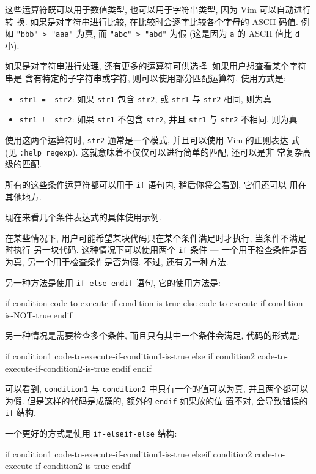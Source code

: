 这些运算符既可以用于数值类型, 也可以用于字符串类型, 因为 Vim 可以自动进行转
换. 如果是对字符串进行比较, 在比较时会逐字比较各个字母的 ASCII 码值. 例如
\texttt{"bbb" > "aaa"} 为真, 而 \texttt{"abc" > "abd"} 为假 (这是因为
\texttt{a} 的 ASCII 值比 \texttt{d} 小).

如果是对字符串进行处理, 还有更多的运算符可供选择. 如果用户想查看某个字符串是
含有特定的子字符串或字符, 则可以使用部分匹配运算符, 使用方式是:
\begin{itemize}
    \item \texttt{str1 =~ str2}: 如果 \texttt{str1} 包含 \texttt{str2}, 或
        \texttt{str1} 与 \texttt{str2} 相同, 则为真
    \item \texttt{str1 !~ str2}: 如果 \texttt{str1} 不包含 \texttt{str2}, 并且
        \texttt{str1} 与 \texttt{str2} 不相同, 则为真
\end{itemize}

使用这两个运算符时, \texttt{str2} 通常是一个模式, 并且可以使用 Vim 的正则表达
式 (见 \texttt{:help regexp}). 这就意味着不仅仅可以进行简单的匹配, 还可以是非
常复杂高级的匹配.

所有的这些条件运算符都可以用于 \texttt{if} 语句内, 稍后你将会看到, 它们还可以
用在其他地方.

现在来看几个条件表达式的具体使用示例.

在某些情况下, 用户可能希望某块代码只在某个条件满足时才执行, 当条件不满足时执行
另一块代码. 这种情况下可以使用两个 \texttt{if} 条件 ---  一个用于检查条件是否
为真, 另一个用于检查条件是否为假. 不过, 还有另一种方法.

另一种方法是使用 \texttt{if-else-endif} 语句, 它的使用方法是:
\begin{vimcode}
if condition
    code-to-execute-if-condition-is-true
else
    code-to-execute-if-condition-is-NOT-true
endif
\end{vimcode}

另一种情况是需要检查多个条件, 而且只有其中一个条件会满足, 代码的形式是:
\begin{vimcode}
if condition1
    code-to-execute-if-condition1-is-true
else
    if condition2
        code-to-execute-if-condition2-is-true
    endif
endif
\end{vimcode}

可以看到, \texttt{condition1} 与 \texttt{condition2} 中只有一个的值可以为真,
并且两个都可以为假. 但是这样的代码是成簇的, 额外的 \texttt{endif} 如果放的位
置不对, 会导致错误的 \texttt{if} 结构.

一个更好的方式是使用 \texttt{if-elseif-else} 结构:
\begin{vimcode}
if condition1
    code-to-execute-if-condition1-is-true
elseif condition2
    code-to-execute-if-condition2-is-true
endif
\end{vimcode}


